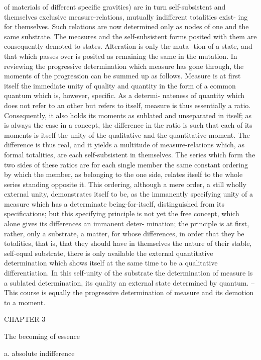 of materials of different specific gravities) are in turn self-subsistent and
themselves exclusive measure-relations, mutually indifferent totalities exist-
ing for themselves. Such relations are now determined only as nodes of one
and the same substrate. The measures and the self-subsistent forms posited
with them are consequently demoted to states. Alteration is only the muta-
tion of a state, and that which passes over is posited as remaining the same
in the mutation.
In reviewing the progressive determination which measure has gone
through, the moments of the progression can be summed up as follows.
Measure is at first itself the immediate unity of quality and quantity in the
form of a common quantum which is, however, specific. As a determi-
nateness of quantity which does not refer to an other but refers to itself,
measure is thus essentially a ratio. Consequently, it also holds its moments
as sublated and unseparated in itself; as is always the case in a concept, the
difference in the ratio is such that each of its moments is itself the unity of
the qualitative and the quantitative moment. The difference is thus real,
and it yields a multitude of measure-relations which, as formal totalities,
are each self-subsistent in themselves. The series which form the two sides
of these ratios are for each single member the same constant ordering
by which the member, as belonging to the one side, relates itself to the
whole series standing opposite it. This ordering, although a mere order,
a still wholly external unity, demonstrates itself to be, as the immanently
specifying unity of a measure which has a determinate being-for-itself,
distinguished from its specifications; but this specifying principle is not
yet the free concept, which alone gives its differences an immanent deter-
mination; the principle is at first, rather, only a substrate, a matter, for
whose differences, in order that they be totalities, that is, that they should
have in themselves the nature of their stable, self-equal substrate, there is
only available the external quantitative determination which shows itself
at the same time to be a qualitative differentiation. In this self-unity of
the substrate the determination of measure is a sublated determination, its
quality an external state determined by quantum. – This course is equally
the progressive determination of measure and its demotion to a moment.

CHAPTER 3

The becoming of essence

a. absolute indifference

